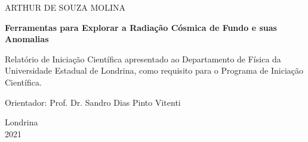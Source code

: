 \documentclass[12pt,a4paper,oneside,brazil]{abntex2}
\theoremstyle{definition}
\numberwithin{defin}{section}
\numberwithin{thm}{section}
\numberwithin{notation}{section}
\theoremstyle{remark}
\numberwithin{exmp}{section}
\numberwithin{p}{section}
\numberwithin{lema}{section}
\begin{document}
	\cleardoublepage{}
	
	\thispagestyle{empty}
	\begin{center}
		{\Large{}ARTHUR DE SOUZA MOLINA}
		\par\end{center}{\Large \par}
	
	\begin{center}
		\vfill{}
		\par\end{center}
	
	\begin{DoubleSpace}
		\begin{center}
			\textbf{\Large{}Ferramentas para Explorar a Radiação Cósmica de Fundo e suas Anomalias}
			\par\end{center}{\Large \par}
	\end{DoubleSpace}
	
	\begin{center}
		\vfill{}
		
		\par\end{center}
	
	\noindent \begin{flushright}
		\begin{minipage}[c]{9.5cm}%
			Relatório de Iniciação Científica apresentado ao Departamento de Física da Universidade Estadual de Londrina, como requisito para o Programa de Iniciação Científica.
			
			Orientador: Prof. Dr. Sandro Dias Pinto Vitenti
		\end{minipage}
		\par\end{flushright}
	
	\vfill{}
	
	\begin{center}
		Londrina\\
		2021
		\par\end{center}
	
	\newpage{}
	
\end{document}
